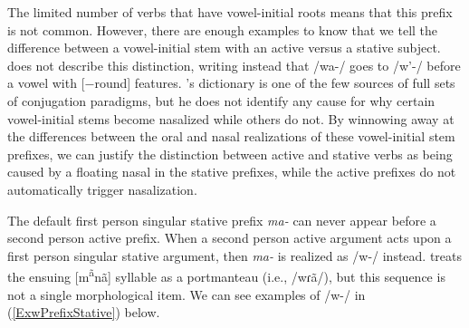 The limited number of verbs that have vowel-initial roots means that this prefix is not common. However, there are enough examples to know that we tell the difference between a vowel-initial stem with an active versus a stative subject. \citet[34]{hollow1970} does not describe this distinction, writing instead that /wa-/ goes to /w'-/ before a vowel with [$-$round] features. \citeauthor{hollow1970}'s dictionary is one of the few sources of full sets of conjugation paradigms, but he does not identify any cause for why certain vowel-initial stems become nasalized while others do not. By winnowing away at the differences between the oral and nasal realizations of these vowel-initial stem prefixes, we can justify the distinction between active and stative verbs as being caused by a floating nasal in the stative prefixes, while the active prefixes do not automatically trigger nasalization.


The default first person singular stative prefix \textit{ma-} can never appear before a second person active prefix. When a second person active argument acts upon a first person singular stative argument, then \textit{ma-} is realized as /w-/ instead. \citet[10]{kennard1936} treats the ensuing [m\textsuperscript{ã}nã] syllable as a portmanteau (i.e., /wɾã/), but this sequence is not a single morphological item. We can see examples of /w-/ in (\ref{ExwPrefixStative}) below.

